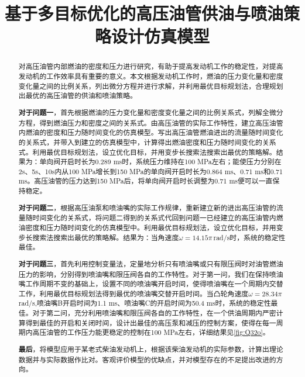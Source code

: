 \documentclass[withoutpreface,bwprint]{cumcmthesis} %
\title{基于多目标优化的高压油管供油与喷油策略设计仿真模型}
\begin{document}
 \maketitle
 \begin{abstract}

对高压油管内部燃油的密度和压力进行研究，有助于提高发动机工作的稳定性，对提高发动机的工作效率具有重要的意义。本文根据发动机工作时，燃油的压力变化量和密度变化量之间的比例关系，列出微分方程并进行求解，并利用最优目标规划法，合理规划出最优的高压油管的供油和喷油策略。

\textbf{对于问题一}，首先根据燃油的压力变化量和密度变化量之间的比例关系式，列解全微分方程，得到燃油压力和密度之间的关系式。由高压油管的实际工作特性，建立高压油管内燃油的密度和压力随时间变化的仿真模型。写出高压油管燃油进出的流量随时间变化的关系式，并带入到建立的仿真模型中，计算得出燃油密度和压力随时间变化的关系式。利用最优目标规划法，设立优化目标，并用变步长搜索法搜索出最优的策略解。结果为：单向阀开启时长为0.289 ms时，系统压力维持在100 MPa左右；能使压力分别在2s、5s、10s内从100 MPa增长到150 MPa的单向阀开启时长为0.864 ms、0.71 ms和0.71 ms。高压油管的压力达到150 MPa后，将单向阀开启时长调整为0.71 ms便可以一直保持稳定。

\textbf{对于问题二}，根据高压油泵和喷油嘴的实际工作规律，重新建立新的进出高压油管的流量随时间变化的关系式，将问题二得到的关系式代回到问题一已经建立的高压油管内燃油密度和压力随时间变化的仿真模型中。利用最优目标规划法，设立优化目标，并用变步长搜索法搜索出最优的策略解。结果为：当角速度$\omega=14.15\pi\,$rad/s时，系统的稳定性最佳。

\textbf{对于问题三}，首先利用控制变量法，定量地分析只有喷油嘴或只有限压阀时对油管燃油压力的影响，分别得到喷油嘴和限压阀各自的工作特性。对于第一问，我们在保持喷油嘴工作周期不变的基础上，设置不同的喷油嘴开启时间，使得喷油嘴在一个周期内交替工作，利用最优目标规划法得到最优的喷油嘴交替开启时间。当凸轮角速度$\omega=28.34\pi\,$rad/s,喷油嘴B开启时间为1.1 ms、喷油嘴C的开启时间为50.4 ms时，系统的稳定性最佳。对于第二问，充分利用喷油嘴和限压阀各自的工作特性，在一个供油周期内严密计算得到最佳的开启和关闭时间，设计出最佳的高压泵和减压的控制方案，使得在每一周期内高压油管的工作压力能更稳定的控制在100 MPa左右，详细结果见\cref{fig:Q32o}。

\textbf{最后}，将模型应用于某老式柴油发动机上，根据该柴油发动机的实际参数，计算出理论数据并与实际数据作比对。客观评价模型的优缺点，并对模型存在的不足提出改进的方向。


\end{abstract}
\end{document}
